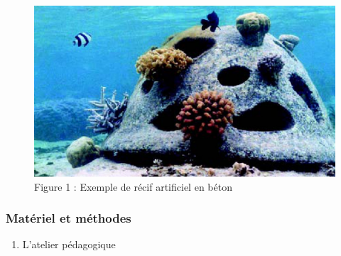 \documentclass[]{article}
\providecommand{\tightlist}{%
  \setlength{\itemsep}{0pt}\setlength{\parskip}{0pt}}
\begin{document}
\begin{figure}

{\centering \includegraphics[width=0.6\linewidth]{images/recif} 

}

\caption{Figure 1 : Exemple de récif artificiel en béton}\label{fig:unnamed-chunk-2}
\end{figure}

\hypertarget{matuxe9riel-et-muxe9thodes}{%
\subsubsection{Matériel et méthodes }\label{matuxe9riel-et-muxe9thodes}}

\begin{enumerate}
\def\labelenumi{\arabic{enumi})}
\tightlist
\item
  L'atelier pédagogique
\end{enumerate}
\end{document}
